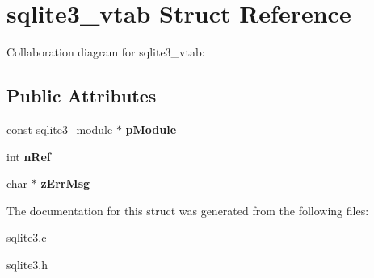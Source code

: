 \hypertarget{structsqlite3__vtab}{}\section{sqlite3\+\_\+vtab Struct Reference}
\label{structsqlite3__vtab}


Collaboration diagram for sqlite3\+\_\+vtab\+:
\subsection*{Public Attributes}
\begin{DoxyCompactItemize}
\item 
const \hyperlink{structsqlite3__module}{sqlite3\+\_\+module} $\ast$ {\bfseries p\+Module}\hypertarget{structsqlite3__vtab_acf0d906e36b113669eaa883c5f8b5ba0}{}\label{structsqlite3__vtab_acf0d906e36b113669eaa883c5f8b5ba0}

\item 
int {\bfseries n\+Ref}\hypertarget{structsqlite3__vtab_ab3c80d385849bdd82363a0df7d6fcba8}{}\label{structsqlite3__vtab_ab3c80d385849bdd82363a0df7d6fcba8}

\item 
char $\ast$ {\bfseries z\+Err\+Msg}\hypertarget{structsqlite3__vtab_a47331586775d674ae951b07ebb902fca}{}\label{structsqlite3__vtab_a47331586775d674ae951b07ebb902fca}

\end{DoxyCompactItemize}


The documentation for this struct was generated from the following files\+:\begin{DoxyCompactItemize}
\item 
sqlite3.\+c\item 
sqlite3.\+h\end{DoxyCompactItemize}

